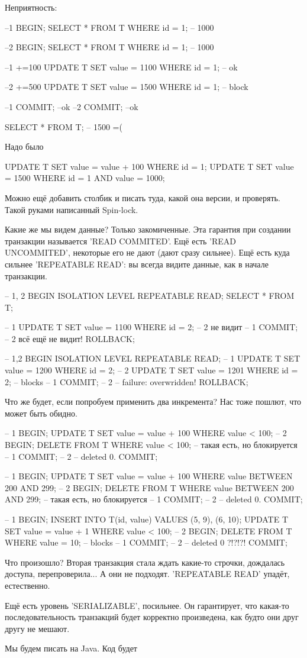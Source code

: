 Неприятность:
\begin{sqlcode}
--1
BEGIN;
SELECT * FROM T WHERE id = 1; -- 1000

--2
BEGIN;
SELECT * FROM T WHERE id = 1; -- 1000

--1 +=100
UPDATE T SET value = 1100 WHERE id = 1; -- ok

--2 +=500
UPDATE T SET value = 1500 WHERE id = 1; -- block

--1
COMMIT; --ok
--2
COMMIT; --ok

SELECT * FROM T; -- 1500 =(
\end{sqlcode}

Надо было
\begin{sqlcode}
UPDATE T SET value = value + 100 WHERE id = 1;
UPDATE T SET value = 1500 WHERE id = 1 AND value = 1000;
\end{sqlcode}
Можно ещё добавить столбик и писать туда, какой она версии, и проверять.
Такой руками написанный Spin-lock.

Какие же мы видем данные? Только закомиченные.
Эта гарантия при создании транзакции называется \sql'READ COMMITED'.
Ещё есть \sql'READ UNCOMMITED', некоторые его не дают (дают сразу сильнее).
Ещё есть куда сильнее \sql'REPEATABLE READ': вы всегда видите данные, как в начале транзакции.
\begin{sqlcode}
-- 1, 2
BEGIN ISOLATION LEVEL REPEATABLE READ;
SELECT * FROM T;

-- 1
UPDATE T SET value = 1100 WHERE id = 2;
-- 2 не видит
-- 1
COMMIT;
-- 2 всё ещё не видит!
ROLLBACK;

-- 1,2
BEGIN ISOLATION LEVEL REPEATABLE READ;
-- 1
UPDATE T SET value = 1200 WHERE id = 2;
-- 2
UPDATE T SET value = 1201 WHERE id = 2; -- blocks
-- 1
COMMIT;
-- 2 -- failure: overwridden!
ROLLBACK;
\end{sqlcode}
Что же будет, если попробуем применить два инкремента?
Нас тоже пошлют, что может быть обидно.
\begin{sqlcode}
-- 1
BEGIN;
UPDATE T SET value = value + 100 WHERE value < 100;
-- 2
BEGIN;
DELETE FROM T WHERE value < 100; -- такая есть, но блокируется
-- 1
COMMIT;
-- 2 -- deleted 0.
COMMIT;

-- 1
BEGIN;
UPDATE T SET value = value + 100 WHERE value BETWEEN 200 AND 299;
-- 2
BEGIN;
DELETE FROM T WHERE value BETWEEN 200 AND 299; -- такая есть, но блокируется
-- 1
COMMIT;
-- 2 -- deleted 0.
COMMIT;

-- 1
BEGIN;
INSERT INTO T(id, value) VALUES (5, 9), (6, 10);
UPDATE T SET value = value + 1 WHERE value < 100;
-- 2
BEGIN;
DELETE FROM T WHERE value = 10; -- blocks
-- 1
COMMIT;
-- 2 -- deleted 0 ?!?!?!
COMMIT;
\end{sqlcode}
Что произошло? Вторая транзакция стала ждать какие-то строчки, дождалась доступа, перепроверила... А они не подходят.
\sql'REPEATABLE READ' упадёт, естественно.

Ещё есть уровень \sql'SERIALIZABLE', посильнее.
Он гарантирует, что какая-то последовательность транзакций будет корректно произведена, как будто они друг другу не мешают.

Мы будем писать на Java. Код будет
